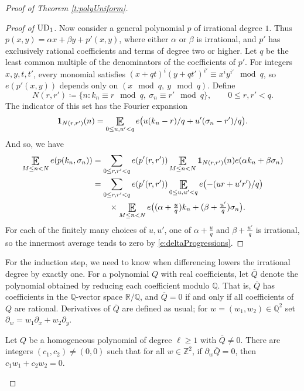 \begin{proof}[Proof of Theorem \ref{t:polyUniform}]
\begin{proof}[Proof of $\textup{UD} _{1}$]
Now consider a general polynomial $p$ of irrational degree $1$. Thus $p(x,y) =\alpha x+\beta y+p'(x,y)$, where 
either $\alpha$ or $\beta$ is irrational, and  $p'$ has exclusively rational coefficients and terms of degree two or higher. 
Let $q$ be the least  common multiple  of the  denominators of the coefficients of $p'$.  
For integers $x,y,t,t'$, every monomial satisfies $(x+qt)^i(y+qt')^{i'}\equiv x^iy^{i'} \mod q$, so 
$e(p'(x,y))$ depends only on $(x \mod q,\ y\mod q)$. 
Define 
\begin{equation} \label{e:Nrq}
  N(r, r') \coloneqq  \{ n \colon k_n \equiv r \mod q ,\  \sigma_n \equiv r'\mod q \} , \qquad 0\leq r,r'<q. 
\end{equation}
The indicator of this set has the Fourier expansion 
\begin{equation}
    \mathbf{1}_{N(r,r')} (n) = \Expectation_{0\leq u,u'<q} 
    e\bigl(u(k_n-r)/q+u'(\sigma_n-r')/q\bigr) . 
\end{equation}
And so, we have 
\begin{align}
    \Expectation 
_{ M \leq n < N } 
e( p(k_n, \sigma_n))
&= \sum_{0\leq r,r'<q} e(p'(r,r'))
    \Expectation 
_{ M \leq n < N } \mathbf{1}_{N(r,r')} (n) 
e( \alpha k_n+\beta \sigma_n)
\\
&= 
\sum_{0\leq r,r'<q} e(p'(r,r'))
 \Expectation_{0\leq u,u'<q} e\bigl(-(ur+u'r')/q\bigr)
 \\ & \qquad \times  \Expectation_{M\leq n < N}  e\bigl( (\alpha+\tfrac uq)k_n+(\beta+\tfrac{u'}q)\sigma_n\bigr). 
\end{align}
For each of the finitely many choices of $u,u'$, one of $\alpha+\frac uq$ and $\beta+\frac{u'}q$ is irrational, 
so the innermost average tends to zero by \eqref{e:deltaProgressions}. 
\end{proof}

For the induction step, we need to know when differencing lowers the irrational degree by exactly one. 
For a polynomial $Q$ with real coefficients, let $\overline Q$ denote the polynomial obtained by reducing each coefficient modulo $\mathbb{Q}$. 
That is, $\overline Q$ has coefficients in the $\mathbb{Q}$-vector space $\mathbb{R}/\mathbb{Q}$, and $\overline Q=0$ if and only if all coefficients of $Q$ are rational. 
Derivatives of $\overline Q$ are defined as usual; for $w=(w_1,w_2)\in\mathbb{Q}^2$ set $\partial_w=w_1\partial_x+w_2\partial_y$. 

\begin{lemma}\label{l:badDirections}
Let $Q$ be a homogeneous polynomial of degree $\ell\geq 1$ with $\overline Q\neq 0$. 
There are integers $(c_1,c_2)\neq(0,0)$ such that for all $w\in\mathbb{Z}^2$, if $\partial_w\overline Q=0$, then $c_1w_1+c_2w_2=0$. 
\end{lemma}


\end{proof}
